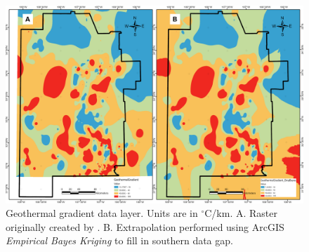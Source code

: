 \begin{figure}[!htp]
\centering
\includegraphics[scale=.50]{templates/images/Figure-PFA_Geothermal_Gradient_sidebyside.png}
\caption[Geothermal gradient data layer]{Geothermal gradient data layer. Units are in $^\circ$C/km. A. Raster originally created by \protect\citet{bielicki_hydrogeolgic_2015}. B. Extrapolation performed using ArcGIS \textit{Empirical Bayes Kriging} to fill in southern data gap.}
\label{fig:feat_pfa_geotherm_gradient}
\end{figure}

